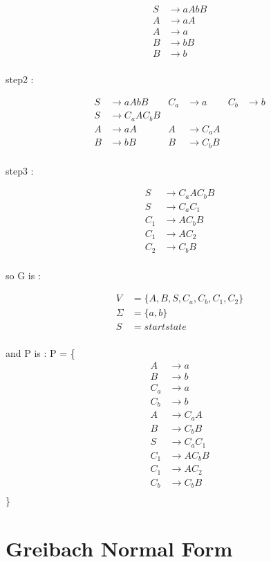 \documentclass[12pt]{book}
\begin{document}
\begin{align*}
S &\to aAbB \\
A &\to aA \\
A &\to a \\
B &\to bB \\
B &\to b \\
\end{align*}

step2 :

\begin{align*}
S &\to aAbB & C_{a} &\to a & C_{b} &\to b \\
S &\to C_{a}AC_{b}B \\
A &\to aA & A &\to C_{a}A \\
B &\to bB & B &\to C_{b}B \\
\end{align*}

step3 :

\begin{align*}
S &\to C_{a}AC_{b}B \\
S &\to C_{a}C_{1} \\
C_{1} &\to AC_{b}B \\
C_{1} &\to AC_{2} \\
C_{2} &\to C_{b}B \\
\end{align*}

so G is :

\begin{align*}
V &= \{ A, B, S, C_{a}, C_{b}, C_{1}, C_{2} \} \\
\Sigma &= \{ a, b \} \\
S &= start state \\
\end{align*}

and P is :
P = \{ 
\begin{align*}
A &\to a \\
B &\to b \\
C_{a} &\to a \\ 
C_{b} &\to b \\ 
A &\to C_{a}A \\ 
B &\to C_{b}B \\ 
S &\to C_{a}C_{1} \\ 
C_{1} &\to AC_{b}B \\ 
C_{1} &\to AC_{2} \\
C_{b} &\to C_{b}B  \\
\end{align*}
\} 

\section{Greibach Normal Form}
\end{document}
